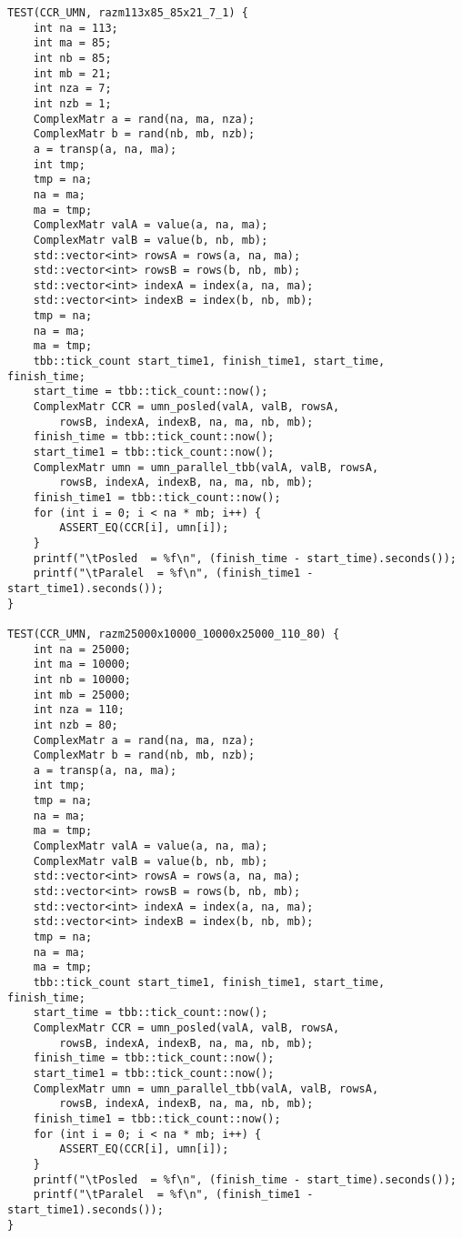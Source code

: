 \documentclass{report}
\begin{document}
\begin{lstlisting}
TEST(CCR_UMN, razm113x85_85x21_7_1) {
    int na = 113;
    int ma = 85;
    int nb = 85;
    int mb = 21;
    int nza = 7;
    int nzb = 1;
    ComplexMatr a = rand(na, ma, nza);
    ComplexMatr b = rand(nb, mb, nzb);
    a = transp(a, na, ma);
    int tmp;
    tmp = na;
    na = ma;
    ma = tmp;
    ComplexMatr valA = value(a, na, ma);
    ComplexMatr valB = value(b, nb, mb);
    std::vector<int> rowsA = rows(a, na, ma);
    std::vector<int> rowsB = rows(b, nb, mb);
    std::vector<int> indexA = index(a, na, ma);
    std::vector<int> indexB = index(b, nb, mb);
    tmp = na;
    na = ma;
    ma = tmp;
    tbb::tick_count start_time1, finish_time1, start_time, finish_time;
    start_time = tbb::tick_count::now();
    ComplexMatr CCR = umn_posled(valA, valB, rowsA,
        rowsB, indexA, indexB, na, ma, nb, mb);
    finish_time = tbb::tick_count::now();
    start_time1 = tbb::tick_count::now();
    ComplexMatr umn = umn_parallel_tbb(valA, valB, rowsA,
        rowsB, indexA, indexB, na, ma, nb, mb);
    finish_time1 = tbb::tick_count::now();
    for (int i = 0; i < na * mb; i++) {
        ASSERT_EQ(CCR[i], umn[i]);
    }
    printf("\tPosled  = %f\n", (finish_time - start_time).seconds());
    printf("\tParalel  = %f\n", (finish_time1 - start_time1).seconds());
}

TEST(CCR_UMN, razm25000x10000_10000x25000_110_80) {
    int na = 25000;
    int ma = 10000;
    int nb = 10000;
    int mb = 25000;
    int nza = 110;
    int nzb = 80;
    ComplexMatr a = rand(na, ma, nza);
    ComplexMatr b = rand(nb, mb, nzb);
    a = transp(a, na, ma);
    int tmp;
    tmp = na;
    na = ma;
    ma = tmp;
    ComplexMatr valA = value(a, na, ma);
    ComplexMatr valB = value(b, nb, mb);
    std::vector<int> rowsA = rows(a, na, ma);
    std::vector<int> rowsB = rows(b, nb, mb);
    std::vector<int> indexA = index(a, na, ma);
    std::vector<int> indexB = index(b, nb, mb);
    tmp = na;
    na = ma;
    ma = tmp;
    tbb::tick_count start_time1, finish_time1, start_time, finish_time;
    start_time = tbb::tick_count::now();
    ComplexMatr CCR = umn_posled(valA, valB, rowsA,
        rowsB, indexA, indexB, na, ma, nb, mb);
    finish_time = tbb::tick_count::now();
    start_time1 = tbb::tick_count::now();
    ComplexMatr umn = umn_parallel_tbb(valA, valB, rowsA,
        rowsB, indexA, indexB, na, ma, nb, mb);
    finish_time1 = tbb::tick_count::now();
    for (int i = 0; i < na * mb; i++) {
        ASSERT_EQ(CCR[i], umn[i]);
    }
    printf("\tPosled  = %f\n", (finish_time - start_time).seconds());
    printf("\tParalel  = %f\n", (finish_time1 - start_time1).seconds());
}


\end{lstlisting}
\end{document}
